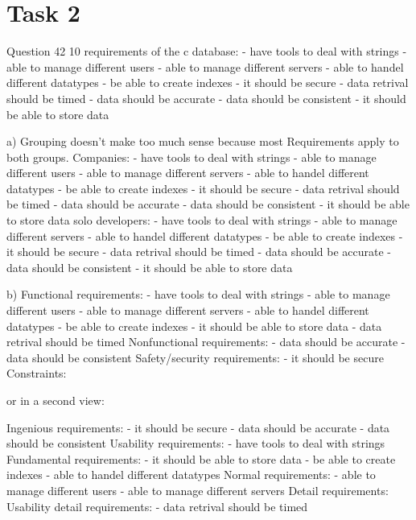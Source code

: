\chapter{Task 2}
Question 42
10 requirements of the c database:
- have tools to deal with strings
- able to manage different users
- able to manage different servers
- able to handel different datatypes
- be able to create indexes
- it should be secure
- data retrival should be timed
- data should be accurate
- data should be consistent
- it should be able to store data

a)
Grouping doesn't make too much sense because most Requirements apply to both groups.
Companies:
- have tools to deal with strings
- able to manage different users
- able to manage different servers
- able to handel different datatypes
- be able to create indexes
- it should be secure
- data retrival should be timed
- data should be accurate
- data should be consistent
- it should be able to store data
solo developers:
- have tools to deal with strings
- able to manage different servers
- able to handel different datatypes
- be able to create indexes
- it should be secure
- data retrival should be timed
- data should be accurate
- data should be consistent
- it should be able to store data

b)
Functional requirements:
- have tools to deal with strings
- able to manage different users
- able to manage different servers
- able to handel different datatypes
- be able to create indexes
- it should be able to store data
- data retrival should be timed
Nonfunctional requirements:
- data should be accurate
- data should be consistent
Safety/security requirements:
- it should be secure
Constraints:

or in a second view:

Ingenious requirements:
- it should be secure
- data should be accurate
- data should be consistent
Usability requirements:
- have tools to deal with strings
Fundamental requirements:
- it should be able to store data
- be able to create indexes
- able to handel different datatypes
 Normal requirements:
- able to manage different users
- able to manage different servers
 Detail requirements:
 Usability detail requirements:
  - data retrival should be timed
  
